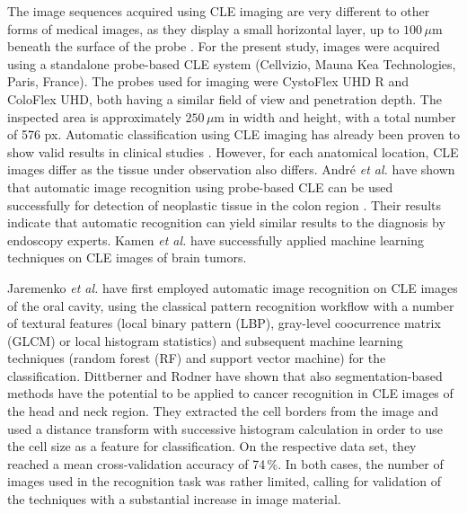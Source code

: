 \documentclass[fleqn,10pt]{wlscirep}
\begin{document}
The image sequences acquired using CLE imaging are very different to other
forms of medical images, as they display a small horizontal layer,
up to $100\,\mu$m beneath the surface of the probe \cite{Mennone:2017jj}. For the
present study, images were acquired using a standalone probe-based CLE
system (Cellvizio, Mauna Kea Technologies, Paris, France). The probes used for imaging were CystoFlex UHD R and ColoFlex UHD, both having a similar field of view and penetration depth. The
inspected area is approximately $250\,\mu $m in width and height, with
a total number of 576 px. Automatic classification
using CLE imaging has already been proven to show valid results in
clinical studies \cite{Andre:2012kw,Kamen:2016jw,Veronese:2013hb}. However, for each anatomical
location, CLE images differ as the tissue under observation also differs.  Andr\'{e} \textit{et al.} have shown that automatic image recognition
using probe-based CLE can be used successfully
for detection of neoplastic tissue in the colon region \cite{Andre:2012kw}. Their results
indicate that automatic recognition can yield similar results to the
diagnosis by endoscopy experts. Kamen \textit{et al.} have successfully applied machine learning techniques on CLE images of brain tumors. \cite{Kamen:2016jw}

Jaremenko \textit{et al.} have first employed automatic image recognition on CLE images
of the oral cavity, using the classical pattern recognition
workflow with a number of textural features (local binary pattern
(LBP), gray-level coocurrence matrix (GLCM) or local histogram
statistics) and subsequent machine
learning techniques (random forest (RF) and support vector machine)
for the classification\cite{Jaremenko:2015kh}.
Dittberner \cite{Dittberner:2016jv} and Rodner \cite{Rodner:2015ts}
have shown that also segmentation-based methods have the
potential to be applied to cancer recognition in CLE images of the
head and neck region.  They extracted the cell borders from the image
and used a distance transform with successive histogram calculation in
order to use the cell size as a feature for classification.
On the respective data set, they reached a mean cross-validation accuracy of
74\,\%\cite{Dittberner:2016jv}.
In both cases, the number of images used in the
recognition task was rather limited, calling for validation of the
techniques with a substantial increase in image material.
\end{document}
